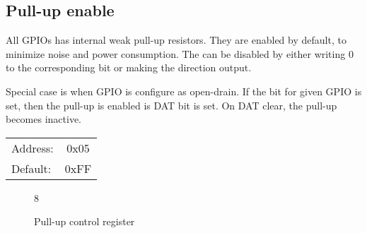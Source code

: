 \documentclass{article}
\begin{document}
	\subsection{Pull-up enable}
	
	All GPIOs has internal weak pull-up resistors. They are enabled by default, to minimize
	noise and power consumption. The can be disabled by either writing 0 to the corresponding
	bit or making the direction output.
	\par
	Special case is when GPIO is configure as open-drain. If the bit for given GPIO is set, then
	the pull-up is enabled is DAT bit is set. On DAT clear, the pull-up becomes inactive. 
	
	\begin{tabular}{ l c }
		Address: & 0x05 \\
		Default: & 0xFF \\
	\end{tabular}
	
	\begin{figure}[H]
		\centering
		\begin{bytefield}[
			bitwidth=0.1\linewidth]{8}
			 \\
		\end{bytefield}
		\caption{Pull-up control register}
		\label{reg:pullup}
	\end{figure}
	
\end{document}
